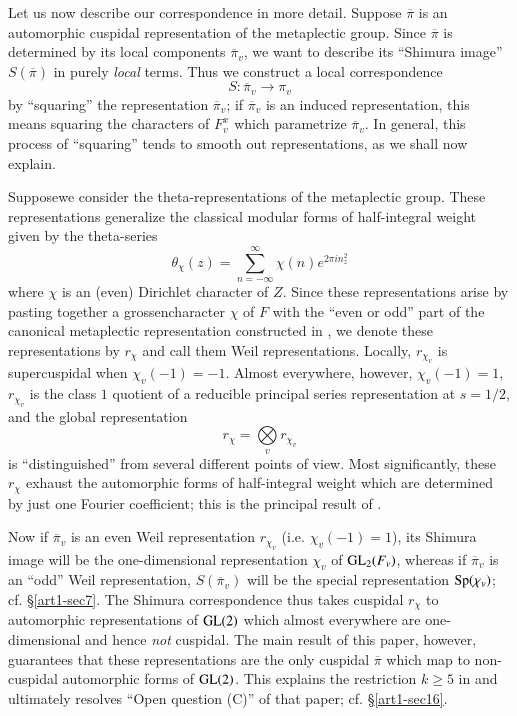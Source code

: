 Let us now describe our correspondence in more detail. Suppose $\overline{\pi}$ is an automorphic cuspidal representation of the metaplectic group. Since $\overline{\pi}$ is determined by its local components $\overline{\pi}_{v}$, we want to describe its ``Shimura image'' $S(\overline{\pi})$ in purely {\em local} terms. Thus we construct a local correspondence
$$
S:\overline{\pi}_{v}\to \pi_{v}
$$
by ``squaring'' the representation $\overline{\pi}_{v}$; if $\overline{\pi}_{v}$ is an induced representation, this means squaring the characters of $F^{x}_{v}$ which parametrize $\overline{\pi}_{v}$. In general, this process of ``squaring'' tends to smooth out representations, as we shall now explain.

Suppose\pageoriginale we consider the theta-representations of the metaplectic group. These representations generalize the classical modular forms of half-integral weight given by the theta-series
$$
\theta_{\chi}(z)=\sum\limits^{\infty}_{n=-\infty}\chi(n)e^{2\pi in^{2}_{z}}
$$
where $\chi$ is an (even) Dirichlet character of $Z$. Since these representations arise by pasting together a grossencharacter $\chi$ of $F$ with the ``even or odd'' part of the canonical metaplectic representation constructed in \cite{Weil}, we denote these representations by $r_{\chi}$ and call them Weil representations. Locally, $r_{\chi_{v}}$ is supercuspidal when $\chi_{v}(-1)=-1$. Almost everywhere, however, $\chi_{v}(-1)=1$, $r_{\chi_{v}}$ is the class $1$ quotient of a reducible principal series representation at $s=1/2$, and the global representation
$$
r_{\chi}=\bigotimes\limits_{v}r_{\chi_{v}}
$$
is ``distinguished'' from several different points of view. Most significantly, these $r_{\chi}$ exhaust the automorphic forms of half-integral weight which are determined by just one Fourier coefficient; this is the principal result of \cite{Ge PS2}.

Now if $\overline{\pi}_{v}$ is an even Weil representation $r_{\chi_{v}}$ (i.e. $\chi_{v}(-1)=1$), its Shimura image will be the one-dimensional representation $\chi_{v}$ of $\mathrm{GL}_{2}(F_{v})$, whereas if $\overline{\pi}_{v}$ is an ``odd'' Weil representation, $S(\overline{\pi}_{v})$ will be the special representation $\operatorname{Sp}(\chi_{v})$; cf. \S\ref{art1-sec7}. The Shimura correspondence thus takes cuspidal $r_{\chi}$ to automorphic representations of $\mathrm{GL}(2)$ which almost everywhere are one-dimensional and hence {\em not} cuspidal. The main result of this paper, however, guarantees that these representations are the only cuspidal $\overline{\pi}$ which map to non-cuspidal automorphic forms of $\mathrm{GL}(2)$. This explains the restriction $k\geq 5$ in \cite{Shim} and ultimately resolves ``Open question (C)'' of that paper; cf. \S\ref{art1-sec16}.

